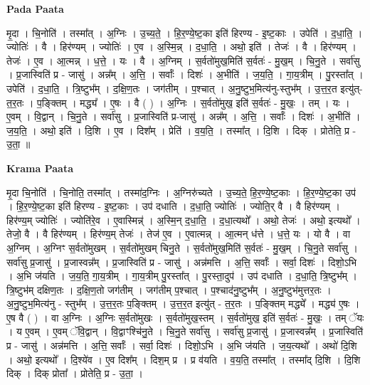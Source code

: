 \documentclass[17pt]{extarticle}
\begin{document}
\textbf{Pada Paata} \newline

मृ॒दा । चि॒नोति॑ । तस्मा᳚त् । अ॒ग्निः । उ॒च्य॒ते॒ । हि॒र॒ण्ये॒ष्ट॒का इति॑ हिरण्य - इ॒ष्ट॒काः । उपेति॑ । द॒धा॒ति॒ । ज्योतिः॑ । वै । हिर॑ण्यम् । ज्योतिः॑ । ए॒व । अ॒स्मि॒न्न् । द॒धा॒ति॒ । अथो॒ इति॑ । तेजः॑ । वै । हिर॑ण्यम् । तेजः॑ । ए॒व । आ॒त्मन्न् । ध॒त्ते॒ । यः । वै । अ॒ग्निम् । स॒र्वतो॑मुख॒मिति॑ स॒र्वतः॑ - मु॒ख॒म् । चि॒नु॒ते । सर्वा॑सु । प्र॒जास्विति॑ प्र - जासु॑ । अन्न᳚म् । अ॒त्ति॒ । सर्वाः᳚ । दिशः॑ । अ॒भीति॑ । ज॒य॒ति॒ । गा॒य॒त्रीम् । पु॒रस्ता᳚त् । उपेति॑ । द॒धा॒ति॒ । त्रि॒ष्टुभ᳚म् । द॒क्षि॒ण॒तः । जग॑तीम् । प॒श्चात् । अ॒नु॒ष्टुभ॒मित्य॑नु-स्तुभ᳚म् । उ॒त्त॒र॒त इत्यु॑त्-त॒र॒तः । प॒ङ्क्तिम् । मद्ध्य᳚ । ए॒षः । वै ( ) । अ॒ग्निः । स॒र्वतो॑मुख॒ इति॑ स॒र्वतः॑ - मु॒खः॒ । तम् । यः । ए॒वम् । वि॒द्वान् । चि॒नु॒ते । सर्वा॑सु । प्र॒जास्विति॑ प्र-जासु॑ । अन्न᳚म् । अ॒त्ति॒ । सर्वाः᳚ । दिशः॑ । अ॒भीति॑ । ज॒य॒ति॒ । अथो॒ इति॑ । दि॒शि । ए॒व । दिश᳚म् । प्रेति॑ । व॒य॒ति॒ । तस्मा᳚त् । दि॒शि । दिक् । प्रोतेति॒ प्र - उ॒ता॒ ॥  \newline


\textbf{Krama Paata} \newline

मृ॒दा चि॒नोति॑ । चि॒नोति॒ तस्मा᳚त् । तस्मा॑द॒ग्निः । अ॒ग्निरु॑च्यते । उ॒च्य॒ते॒ हि॒र॒ण्ये॒ष्ट॒काः । हि॒र॒ण्ये॒ष्ट॒का उप॑ । हि॒र॒ण्ये॒ष्ट॒का इति॑ हिरण्य - इ॒ष्ट॒काः । उप॑ दधाति । द॒धा॒ति॒ ज्योतिः॑ । ज्योति॒र् वै । वै हिर॑ण्यम् । हिर॑ण्य॒म् ज्योतिः॑ । ज्योति॑रे॒व । ए॒वास्मिन्न्॑ । अ॒स्मि॒न् द॒धा॒ति॒ । द॒धा॒त्यथो᳚ । अथो॒ तेजः॑ । अथो॒ इत्यथो᳚ । तेजो॒ वै । वै हिर॑ण्यम् । हिर॑ण्य॒म् तेजः॑ । तेज॑ ए॒व । ए॒वात्मन्न् । आ॒त्मन् ध॑त्ते । ध॒त्ते॒ यः । यो वै । वा अ॒ग्निम् । अ॒ग्निꣳ स॒र्वतो॑मुखम् । स॒र्वतो॑मुखम् चिनु॒ते । स॒र्वतो॑मुख॒मिति॑ स॒र्वतः॑ - मु॒ख॒म् । चि॒नु॒ते सर्वा॑सु । सर्वा॑सु प्र॒जासु॑ । प्र॒जास्वन्न᳚म् । प्र॒जास्विति॑ प्र - जासु॑ । अन्न॑मत्ति । अ॒त्ति॒ सर्वाः᳚ । सर्वा॒ दिशः॑ । दिशो॒ऽभि । अ॒भि ज॑यति । ज॒य॒ति॒ गा॒य॒त्रीम् । गा॒य॒त्रीम् पु॒रस्ता᳚त् । पु॒रस्ता॒दुप॑ । उप॑ दधाति । द॒धा॒ति॒ त्रि॒ष्टुभ᳚म् । त्रि॒ष्टुभ॑म् दक्षिण॒तः । द॒क्षि॒ण॒तो जग॑तीम् । जग॑तीम् प॒श्चात् । प॒श्चाद॑नु॒ष्टुभ᳚म् । अ॒नु॒ष्टुभ॑मुत्तर॒तः । अ॒नु॒ष्टुभ॒मित्य॑नु - स्तुभ᳚म् । उ॒त्त॒र॒तः प॒ङ्क्तिम् । उ॒त्त॒र॒त इत्यु॑त् - त॒र॒तः । प॒ङ्क्तिम् मद्ध्ये᳚ । मद्ध्य॑ ए॒षः । ए॒ष वै ( ) । वा अ॒ग्निः । अ॒ग्निः स॒र्वतो॑मुखः । स॒र्वतो॑मुख॒स्तम् । स॒र्वतो॑मुख॒ इति॑ स॒र्वतः॑ - मु॒खः॒ । तम् ॅयः । य ए॒वम् । ए॒वम् ॅवि॒द्वान् । वि॒द्वाꣳश्चि॑नु॒ते । चि॒नु॒ते सर्वा॑सु । सर्वा॑सु प्र॒जासु॑ । प्र॒जास्वन्न᳚म् । प्र॒जास्विति॑ प्र - जासु॑ । अन्न॑मत्ति । अ॒त्ति॒ सर्वाः᳚ । सर्वा॒ दिशः॑ । दिशो॒ऽभि । अ॒भि ज॑यति । ज॒य॒त्यथो᳚ । अथो॑ दि॒शि । अथो॒ इत्यथो᳚ । दि॒श्ये॑व । ए॒व दिश᳚म् । दिश॒म् प्र । प्र व॑यति । व॒य॒ति॒ तस्मा᳚त् । तस्मा᳚द् दि॒शि । दि॒शि दिक् । दिक् प्रोता᳚ । प्रोतेति॒ प्र - उ॒ता॒ । \newline
\end{document}
